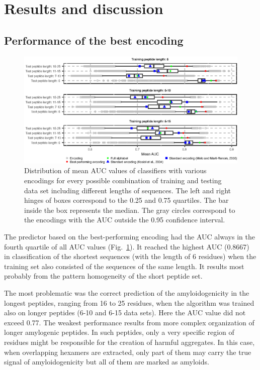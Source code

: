 \documentclass[fleqn,10pt,twoside]{gcb15submission}
\begin{document}
\section{Results and discussion}


\subsection{Performance of the best encoding}

\begin{figure}[h]
\centerline{\includegraphics{figures/AUC_boxplot.eps}}
\caption{Distribution of mean AUC values of classifiers with various encodings 
for every possible combination of training and testing data set including 
different lengths of sequences. The left and right hinges of boxes correspond 
to 
the 0.25 and 0.75 quartiles. The bar inside the box represents the median. The 
gray circles correspond to the encodings with the AUC outside the 0.95 
confidence interval. 
}\label{fig:AUC_boxplot}

\end{figure}

The predictor based on the best-performing encoding had the AUC always in the 
fourth quartile of all AUC values (Fig.~\ref{fig:AUC_boxplot}). It reached the 
highest AUC (0.8667) in classification of the shortest sequences (with the 
length of 6 residues) when the training set also consisted of the sequences of 
the same length. It results most probably from the pattern homogeneity of the 
short peptide set. 

  The most problematic was the correct prediction of the amyloidogenicity in the 
longest peptides, ranging from 16 to 25 residues, when the algorithm was trained 
also on longer peptides (6-10 and 6-15 data sets). Here the AUC value did not 
exceed 0.77. The weakest performance results from more complex organization of 
longer amylogenic peptides. In such peptides, only a very specific region of 
residues might be responsible for the creation of harmful aggregates. In this 
case, when overlapping hexamers are extracted, only part of them may carry the 
true signal of amyloidogenicity but all of them are marked as amyloids. 
\end{document}

